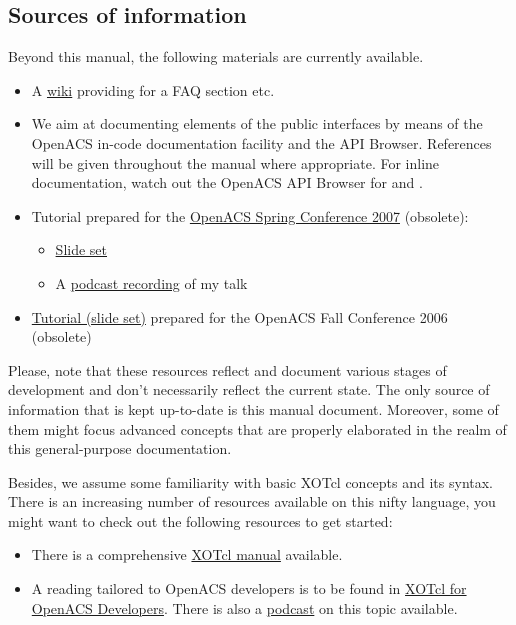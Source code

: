 \subsection{Sources of information}
Beyond this manual, the following materials are currently available.
\begin{itemize}
\item A \href{http://alice.wu-wien.ac.at:8000/xorb-doc}{wiki} providing for a FAQ section etc.
\item We aim at documenting elements of the public interfaces by means of the OpenACS in-code 
documentation facility and the API Browser. References will be given throughout the manual where 
appropriate. For inline documentation, watch out the OpenACS API Browser for  and .
\item Tutorial prepared for the \href{http://oacs-dotlrn-conf2007.wu-wien.ac.at/}{OpenACS Spring 
Conference 2007} (obsolete):
\begin{itemize} 
\item \href{http://oacs-dotlrn-conf2007.wu-wien.ac.at/conf2007/file/sobernig-xosoap-slides.pdf?
m=download|Slide set}{Slide set}
\item A \href{http://oacs-dotlrn-conf2007.wu-wien.ac.at/conf2007/file/tutorial-sobernig.mp4?
m=download}{podcast recording} of my talk
\end{itemize}
\item \href{http://nm.wu-wien.ac.at/research/publications/b670.pdf}{Tutorial (slide set)} prepared for the 
OpenACS Fall Conference 2006 (obsolete) 
\end{itemize}
Please, note that these resources reflect and document various stages of development and don't 
necessarily reflect the current state. The only source of information that is kept up-to-date is this manual 
document. Moreover, some of them might focus advanced concepts that are properly 
elaborated in the realm of this general-purpose documentation.

Besides, we assume some familiarity with basic XOTcl concepts and its syntax. There is an increasing number of resources available on this nifty language, you might want to check out the following resources to get started:

\begin{itemize}
\item There is a comprehensive \href{http://media.wu-wien.ac.at/doc/tutorial.html}{XOTcl manual} available.
\item A reading tailored to OpenACS developers is to be found in \href{http://www.matuska.org/martin/doc/xotcl-openacs-2007.pdf}{XOTcl for OpenACS Developers}. There is also a \href{http://www.matuska.org/martin/doc/xotcl-openacs-2007-p.pdf}{podcast} on this topic available.
\end{itemize}
